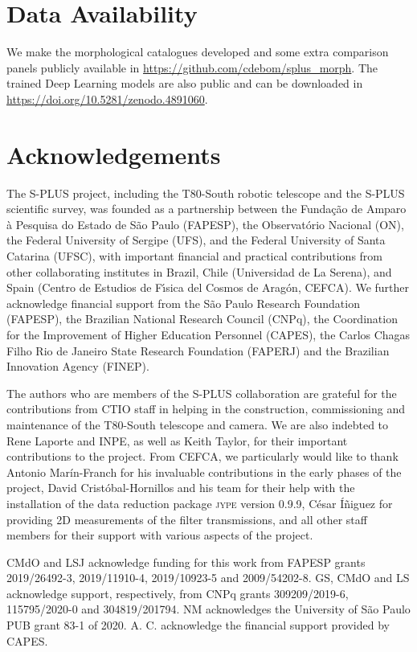 \documentclass[fleqn,usenatbib]{mnras}
\begin{document}
\section*{Data Availability}
We make the morphological catalogues developed and some extra comparison panels publicly available in \url{https://github.com/cdebom/splus_morph}. The trained Deep Learning models are also public and can be downloaded in \url{https://doi.org/10.5281/zenodo.4891060}.
 

\section*{Acknowledgements}





The S-PLUS project, including the T80-South robotic telescope and the S-PLUS scientific survey, was founded as a partnership between the Funda\c{c}\~{a}o de Amparo \`{a} Pesquisa do Estado de S\~{a}o Paulo (FAPESP), the Observat\'{o}rio Nacional (ON), the Federal University of Sergipe (UFS), and the Federal University of Santa Catarina (UFSC), with important financial and practical contributions from other collaborating institutes in Brazil, Chile (Universidad de La Serena), and Spain (Centro de Estudios de F\'{\i}sica del Cosmos de Arag\'{o}n, CEFCA). We further acknowledge financial support from the São Paulo Research Foundation (FAPESP), the Brazilian National Research Council (CNPq), the Coordination for the Improvement of Higher Education Personnel (CAPES), the Carlos Chagas Filho Rio de Janeiro State Research Foundation (FAPERJ) and the Brazilian Innovation Agency (FINEP).

The authors who are members of the S-PLUS collaboration are grateful for the contributions from CTIO staff in helping in the construction, commissioning and maintenance of the T80-South telescope and camera. We are also indebted to Rene Laporte and INPE, as well as Keith Taylor, for their important contributions to the project. From CEFCA, we particularly would like to thank Antonio Mar\'{i}n-Franch for his invaluable contributions in the early phases of the project, David Crist{\'o}bal-Hornillos and his team for their help with the installation of the data reduction package \textsc{jype} version 0.9.9, C\'{e}sar \'{I}\~{n}iguez for providing 2D measurements of the filter transmissions, and all other staff members for their support with various aspects of the project.

CMdO and LSJ acknowledge funding for this work from FAPESP grants 2019/26492-3, 2019/11910-4, 2019/10923-5 and 2009/54202-8. GS, CMdO and LS acknowledge  support, respectively, from CNPq grants 309209/2019-6, 115795/2020-0 and 304819/201794. NM acknowledges the University of São Paulo PUB grant 83-1 of 2020.  
A. C. acknowledge the financial support provided by CAPES.
\end{document}

